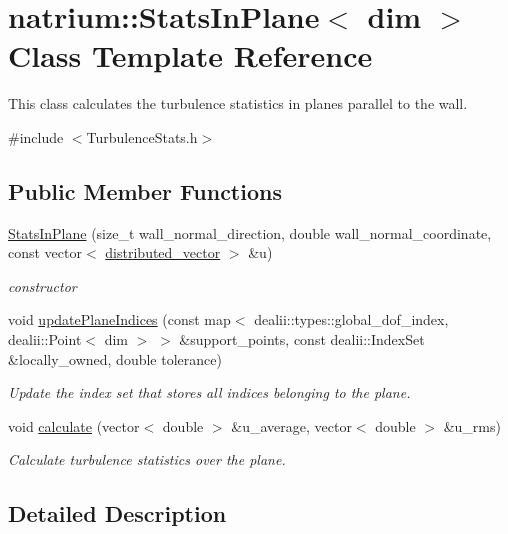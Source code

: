 \hypertarget{classnatrium_1_1StatsInPlane}{
\section{natrium::StatsInPlane$<$ dim $>$ Class Template Reference}
\label{classnatrium_1_1StatsInPlane}
}


This class calculates the turbulence statistics in planes parallel to the wall.  


{\ttfamily \#include $<$TurbulenceStats.h$>$}\subsection*{Public Member Functions}
\begin{DoxyCompactItemize}
\item 
\hyperlink{classnatrium_1_1StatsInPlane_aea872f2aa9980983764aed1866f53903}{StatsInPlane} (size\_\-t wall\_\-normal\_\-direction, double wall\_\-normal\_\-coordinate, const vector$<$ \hyperlink{namespacenatrium_a903d2b92917f582f2ff05f52160ab811}{distributed\_\-vector} $>$ \&u)
\begin{DoxyCompactList}\small\item\em constructor \item\end{DoxyCompactList}\item 
void \hyperlink{classnatrium_1_1StatsInPlane_aa6e53875ea989769eacbbb80bfd41fac}{updatePlaneIndices} (const map$<$ dealii::types::global\_\-dof\_\-index, dealii::Point$<$ dim $>$ $>$ \&support\_\-points, const dealii::IndexSet \&locally\_\-owned, double tolerance)
\begin{DoxyCompactList}\small\item\em Update the index set that stores all indices belonging to the plane. \item\end{DoxyCompactList}\item 
void \hyperlink{classnatrium_1_1StatsInPlane_a648a470e8c462c10c9915a7a920c50ef}{calculate} (vector$<$ double $>$ \&u\_\-average, vector$<$ double $>$ \&u\_\-rms)
\begin{DoxyCompactList}\small\item\em Calculate turbulence statistics over the plane. \item\end{DoxyCompactList}\end{DoxyCompactItemize}


\subsection{Detailed Description}
